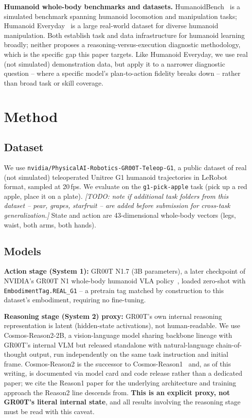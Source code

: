 \documentclass[conference]{IEEEtran}
\begin{document}
\textbf{Humanoid whole-body benchmarks and datasets.}
HumanoidBench~\cite{sferrazza2024humanoidbench} is a simulated benchmark spanning
humanoid locomotion and manipulation tasks; Humanoid Everyday~\cite{zhao2025humanoideveryday}
is a large real-world dataset for diverse humanoid manipulation. Both establish task and
data infrastructure for humanoid learning broadly; neither proposes a
reasoning-versus-execution diagnostic methodology, which is the specific gap this paper
targets. Like Humanoid Everyday, we use real (not simulated) demonstration data, but
apply it to a narrower diagnostic question -- where a specific model's plan-to-action
fidelity breaks down -- rather than broad task or skill coverage.

\section{Method}
\label{sec:method}

\subsection{Dataset}

We use \texttt{nvidia/PhysicalAI-Robotics-GR00T-Teleop-G1}, a public dataset of real (not
simulated) teleoperated Unitree G1 humanoid trajectories in LeRobot format, sampled at
20\,fps. We evaluate on the \texttt{g1-pick-apple} task (pick up a red apple, place it on
a plate). \textit{[TODO: note if additional task folders from this dataset -- pear,
grapes, starfruit -- are added before submission for cross-task generalization.]} State
and action are 43-dimensional whole-body vectors (legs, waist, both arms, both hands).

\subsection{Models}

\textbf{Action stage (System 1):} GR00T N1.7 (3B parameters), a later checkpoint of
NVIDIA's GR00T N1 whole-body humanoid VLA policy~\cite{bjorck2025groot}, loaded zero-shot
with \texttt{EmbodimentTag.REAL\_G1} -- a pretrain tag matched by construction to this
dataset's embodiment, requiring no fine-tuning.

\textbf{Reasoning stage (System 2) proxy:} GR00T's own internal reasoning representation
is latent (hidden-state activations), not human-readable. We use Cosmos-Reason2-2B, a
vision-language model sharing backbone lineage with GR00T's internal VLM but released
standalone with natural-language chain-of-thought output, run independently on the same
task instruction and initial frame. Cosmos-Reason2 is the successor to
Cosmos-Reason1~\cite{azzolini2025cosmosreason1} and, as of this writing, is documented via
model card and code release rather than a dedicated paper; we cite the Reason1 paper for
the underlying architecture and training approach the Reason2 line descends from.
\textbf{This is an explicit proxy, not GR00T's literal internal state}, and all results
involving the reasoning stage must be read with this caveat.
\end{document}
